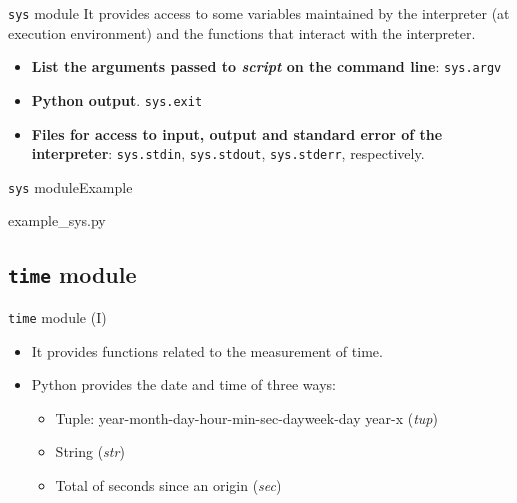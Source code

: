 \documentclass[10pt,compress]{beamer} %
\begin{document}
\begin{frame}{\texttt{sys} module}
\vspace{-0.2cm}
It provides access to some variables maintained by the interpreter (at execution environment) and the functions that interact with the interpreter.\\
\begin{block}{}
\footnotesize{
\begin{itemize}			
\item \textbf{List the arguments passed to \textit{script} on the command line}: \texttt{sys.argv}
\item \textbf{Python output}. \texttt{sys.exit}
\item \textbf{Files for access to input, output and standard error of the interpreter}: \texttt{sys.stdin}, \texttt{sys.stdout}, \texttt{sys.stderr}, respectively. 

\end{itemize}
}
\end{block}	
\end{frame}

\begin{frame}{\texttt{sys} module}{Example}

\vspace{-0.2cm}
	\begin{block}{example\_sys.py}

	

	\end{block}
\end{frame}

\subsection{\texttt{time} module}

\begin{frame}{\texttt{time} module (I)}

\begin{itemize}
\item It provides functions related to the measurement of time.
\item Python provides the date and time of three ways:\\
\begin{itemize}
\item Tuple: year-month-day-hour-min-sec-dayweek-day year-x (\textit{tup})
\item String (\textit{str})
\item Total of seconds since an origin (\textit{sec})
\end{itemize}
\end{itemize}

\end{frame}
\end{document}
